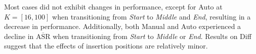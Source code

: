 Most cases did not exhibit changes in performance, except for Auto at $K=[16,100]$ when transitioning from \textit{Start} to \textit{Middle} and \textit{End}, resulting in a decrease in performance. Additionally, both Manual and Auto experienced a decline in $\overline{\text{ASR}}$ when transitioning from \textit{Start} to \textit{Middle} or \textit{End}. Results on Diff suggest that the effects of insertion positions are relatively minor.

